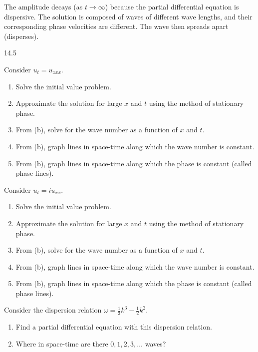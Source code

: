 The amplitude decays (as $t \to \infty$) because the partial differential equation is dispersive.  The solution is composed of waves of different wave lengths, and their corresponding phase velocities are different.  The wave then spreads apart (disperses).

\begin{exercises}{14.5}
\item Consider $u_t = u_{xxx}$.
\begin{enumerate}
\item[(a)] Solve the initial value problem.
\item[(b)] Approximate the solution for large $x$ and $t$ using the method of stationary phase.
\item[(c)] From (b), solve for the wave number as a function of $x$ and $t$.
\item[(d)] From (b), graph lines in space-time along which the wave number is constant.
\item[(e)] From (b), graph lines in space-time along which the phase is constant (called phase lines).
\end{enumerate}

\item Consider $u_t = iu_{xx}$.
\begin{enumerate}
\item[(a)] Solve the initial value problem.
\item[(b)] Approximate the solution for large $x$ and $t$ using the method of stationary phase.
\item[(c)] From (b), solve for the wave number as a function of $x$ and $t$.
\item[(d)] From (b), graph lines in space-time along which the wave number is constant.
\item[(e)] From (b), graph lines in space-time along which the phase is constant (called phase lines).
\end{enumerate}

\item Consider the dispersion relation $\omega = \frac{1}{3}k^3 - \frac{1}{2}k^2$.
\begin{enumerate}
\item[(a)] Find a partial differential equation with this dispersion relation.
\item[\starred (b)] Where in space-time are there $0, 1, 2, 3, \ldots$ waves?
\end{enumerate}


\end{exercises}
